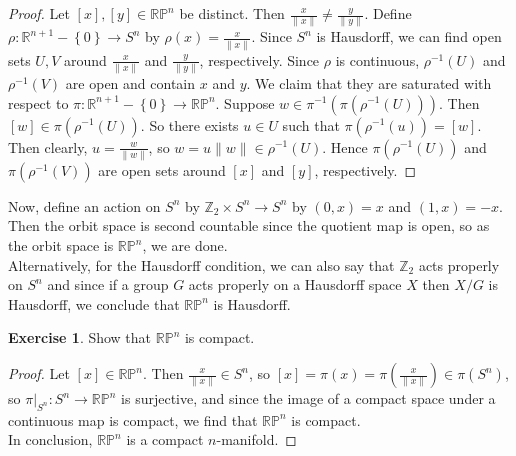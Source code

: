 \documentclass[reqno]{amsart}
\theoremstyle{plain}%
\theoremstyle{definition}
\newtheorem{exercise}[theorem]{Exercise}
\theoremstyle{remark}
\begin{document}
        \begin{proof}
        Let $\left[ x \right] , \left[ y \right] 
        \in \mathbb{R}\mathbb{P}^{n}$ be distinct.
        Then $\frac{x}{\|x\|} \neq \frac{y}{\|y\|}$. Define
        $\rho  \colon \mathbb{R}^{n+1} - \left\{ 0 \right\} \to 
        S^{n}$ by $\rho (x) = \frac{x}{\|x\|}$. Since $S^{n}$ is Hausdorff, we can find
        open sets $U,V$ around $\frac{x}{\|x\|}$ and $\frac{y}{\|y\|}$, respectively.
        Since $\rho$ is continuous, $\rho^{-1}(U)$ and $\rho^{-1}(V)$ are open and
        contain $x$ and $y$. We claim that they are saturated with respect to
        $\pi  \colon \mathbb{R}^{n+1} - \left\{ 0 \right\} \to 
        \mathbb{R}\mathbb{P}^{n}$. Suppose
        $w \in \pi^{-1}\left( \pi \left( \rho^{-1}(U) \right)  \right) $. Then
        $\left[ w \right] \in \pi \left( \rho^{-1}(U) \right) $. So there
        exists $u \in U$ such that $\pi \left( \rho^{-1}\left( u \right)  \right) 
        = \left[ w \right] $. Then clearly, $u = \frac{w}{\|w\|}$, so
        $w = u \|w\| \in \rho^{-1}(U)$. Hence
        $\pi \left( \rho^{-1}(U) \right) $ and
        $\pi\left( \rho^{-1}(V) \right) $ are open sets around
        $\left[ x \right] $ and $\left[ y \right] $, respectively.
        \end{proof}





        Now, define an action on  $S^{n}$ by
        $\mathbb{Z}_2 \times S^{n} \to S^{n}$ by
        $\left( 0, x \right) =x$ and
        $\left( 1,x \right) = -x$. Then
        the orbit space is second countable since the quotient map is
        open, so as the orbit space is $\mathbb{R}\mathbb{P}^{n}$, we are done.\\
        Alternatively, for the Hausdorff condition, we can also say that
        $\mathbb{Z}_2$ acts properly on $S^{n}$ and since if a group $G$ acts properly
        on a Hausdorff space $X$ then $X /G$ is Hausdorff, we conclude that
        $\mathbb{R}\mathbb{P}^{n}$ is Hausdorff.

        \begin{exercise}
            Show that $\mathbb{R}\mathbb{P}^{n}$ is compact.
        \end{exercise} 
        \begin{proof}
                 Let $\left[ x \right] \in \mathbb{R}\mathbb{P}^{n}$. Then
        $\frac{x}{\|x\|}\in S^{n}$, so
        $\left[ x \right] = \pi \left(x  \right) =
        \pi \left( \frac{x}{\|x\|} \right) \in \pi\left( S^{n} \right) $, so
        $\pi|_{S^{n} } \colon S^{n} \to \mathbb{R}\mathbb{P}^{n}$ is surjective, and
        since the image of a compact space under a continuous map is compact, we find
        that $\mathbb{R}\mathbb{P}^{n}$ is compact.\\
        \linebreak
        In conclusion, $\mathbb{R}\mathbb{P}^{n}$ is a compact $n$-manifold.
        \end{proof}
\end{document}
